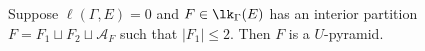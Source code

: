 \begin{theorem}\label{thm:interiornonvanish}
Suppose $\ell(\Gamma,E) = 0$ and $F \in \lk_\Gamma(E)$ has an interior partition $F = F_1 \sqcup F_2 \sqcup \mathcal{A}_F$ such that $|F_1| \leq 2$.  Then $F$ is a $U$-pyramid.
\end{theorem}
